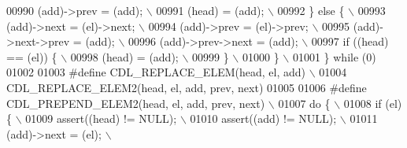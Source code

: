 \begin{DoxyCode}
00990 \textcolor{preprocessor}{  (add)->prev = (add);                                                                         \(\backslash\)}
00991 \textcolor{preprocessor}{  (head) = (add);                                                                              \(\backslash\)}
00992 \textcolor{preprocessor}{ \} else \{                                                                                      \(\backslash\)}
00993 \textcolor{preprocessor}{  (add)->next = (el)->next;                                                                    \(\backslash\)}
00994 \textcolor{preprocessor}{  (add)->prev = (el)->prev;                                                                    \(\backslash\)}
00995 \textcolor{preprocessor}{  (add)->next->prev = (add);                                                                   \(\backslash\)}
00996 \textcolor{preprocessor}{  (add)->prev->next = (add);                                                                   \(\backslash\)}
00997 \textcolor{preprocessor}{  if ((head) == (el)) \{                                                                        \(\backslash\)}
00998 \textcolor{preprocessor}{   (head) = (add);                                                                             \(\backslash\)}
00999 \textcolor{preprocessor}{  \}                                                                                            \(\backslash\)}
01000 \textcolor{preprocessor}{ \}                                                                                             \(\backslash\)}
01001 \textcolor{preprocessor}{\} while (0)}
01002 
01003 \textcolor{preprocessor}{#define CDL\_REPLACE\_ELEM(head, el, add)                                                        \(\backslash\)}
01004 \textcolor{preprocessor}{    CDL\_REPLACE\_ELEM2(head, el, add, prev, next)}
01005 
01006 \textcolor{preprocessor}{#define CDL\_PREPEND\_ELEM2(head, el, add, prev, next)                                           \(\backslash\)}
01007 \textcolor{preprocessor}{do \{                                                                                           \(\backslash\)}
01008 \textcolor{preprocessor}{  if (el) \{                                                                                    \(\backslash\)}
01009 \textcolor{preprocessor}{    assert((head) != NULL);                                                                    \(\backslash\)}
01010 \textcolor{preprocessor}{    assert((add) != NULL);                                                                     \(\backslash\)}
01011 \textcolor{preprocessor}{    (add)->next = (el);                                                                        \(\backslash\)}

\end{DoxyCode}
